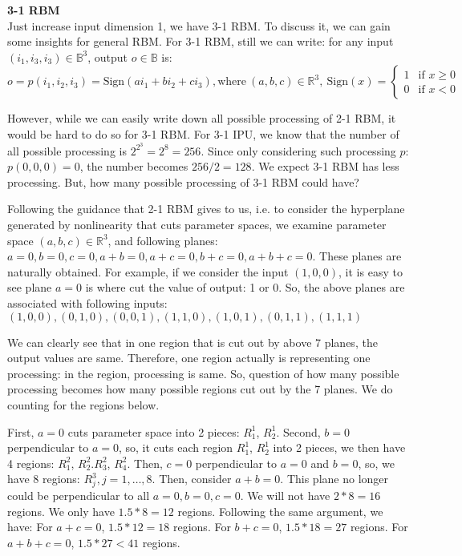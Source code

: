 {\bf 3-1 RBM} \\
Just increase input dimension 1, we have 3-1 RBM. To discuss it, we can gain some insights for general RBM. For 3-1 RBM, still we can write: for any input $(i_1, i_3, i_3) \in \mathbb{B}^3$, output $o \in \mathbb{B}$ is:
$$
o = p(i_1, i_2, i_3) = \text{Sign}(a i_1 + b  i_2 + c i_3), \text{where} \ (a, b, c) \in \mathbb{R}^3, \ \text{Sign}(x) =
\left\{
	\begin{array}{ll}
		1  & \mbox{if } x \ge 0 \\
		0  & \mbox{if } x < 0
	\end{array}
\right.
$$

However, while we can easily write down all possible processing of 2-1 RBM, it would be hard to do so for 3-1 RBM. For 3-1 IPU, we know that the number of all possible processing is $2^{2^3} = 2^8 = 256$. Since only considering such processing $p$: $p(0, 0, 0) = 0$, the number becomes $256/2 = 128$. We expect 3-1 RBM has less processing. But, how many possible processing of 3-1 RBM could have?

Following the guidance that 2-1 RBM gives to us, i.e. to consider the hyperplane generated by nonlinearity that cuts parameter spaces, we examine parameter space $(a, b, c) \in \mathbb{R}^3$, and following planes:
$a = 0, b = 0, c = 0, a+b = 0, a+c = 0, b+c = 0, a+b+c =0$. 
These planes are naturally obtained. For example, if we consider the input $(1, 0, 0)$, it is easy to see plane $a = 0$ is where cut the value of output: 1 or 0. So, the above planes are associated with following inputs:
$(1, 0, 0), (0, 1, 0), (0, 0, 1), (1, 1, 0), (1, 0, 1), (0, 1, 1), (1, 1, 1)$

We can clearly see that in one region that is cut out by above 7 planes, the output values are same. Therefore, one region actually is representing one processing: in the region, processing is same. So, question of how many possible processing becomes how many possible regions cut out by the 7 planes. We do counting for the regions below. 

First, $a = 0$ cuts parameter space into 2 pieces: $R_1^1$, $R_2^1$. 
Second, $b = 0$ perpendicular to $a = 0$, so, it cuts each region  $R_1^1$, $R_2^1$ into 2 pieces, we then have 4 regions: $R_1^2$, $R_2^2$.$R_3^2$, $R_4^2$. 
Then, $c = 0$ perpendicular to $a = 0$ and $b = 0$, so, we have 8 regions: $R_j^3, j=1, \ldots, 8$.
Then, consider $a+b = 0$. This plane no longer could be perpendicular to all $a = 0, b = 0, c = 0$. We will not have $2 * 8 = 16$ regions. We only have $1.5 * 8 = 12$ regions.
Following the same argument, we have: For $a+c = 0$, $1.5 * 12 = 18$ regions. For $b+c = 0$, $1.5 * 18 = 27$ regions. For $a+b+c = 0$, $1.5 * 27 < 41$ regions. 

